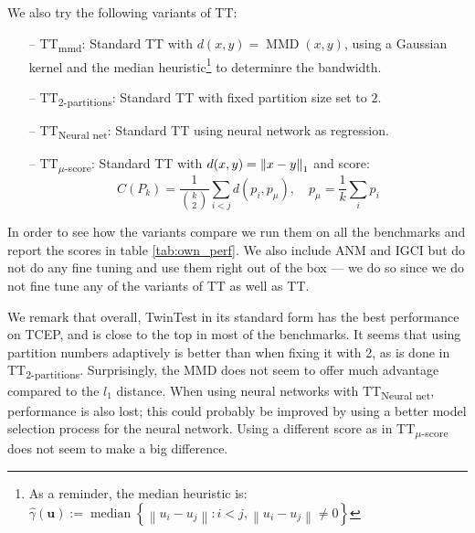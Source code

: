 We also try the following variants of TT:

\begin{itemize}
    \item[--] TT\textsubscript{mmd}: Standard TT with 
        $d(x, y) = \operatorname{MMD}(x, y)$, using a Gaussian kernel and the median heuristic\footnote{
            As a reminder, the median heuristic is: 
            $\hat{\gamma}(\mathbf{u}):=\operatorname{median}\left\{\left\|u_{i}-u_{j}\right\|:  i<j ,\left\|u_{i}-u_{j}\right\| \neq 0\right\}$}
         to determinre the bandwidth.
    \item[--] TT\textsubscript{2-partitions}: Standard TT with fixed partition size set to $2$.
    \item[--] TT\textsubscript{Neural net}: Standard TT using neural network as regression.
    \item[--] TT\textsubscript{$\mu$-score}: Standard TT with $d(x, y) = \left\lVert x - y\right\rVert_1$ and score:
    $$
    C(P_k) = \frac{1}{\binom{k}{2}} \sum_{i < j} d(p_i, p_\mu)
    , \quad p_\mu = \frac{1}{k} \sum_i p_i
    $$
\end{itemize}


In order to see how the variants compare we run them on all the benchmarks and report the 
scores in table \ref{tab:own_perf}. We also include ANM and IGCI but do not do any fine 
tuning and use them right out of the box --- we do so since we do not fine tune any 
of the variants of TT as well as TT. 

We remark that overall, TwinTest in its standard form has the best performance on TCEP, 
and is close to the top in most of the benchmarks. It seems 
that using partition numbers adaptively is better than when fixing it with 2, as is 
done in TT\textsubscript{2-partitions}. Surprisingly, the MMD does not seem to 
offer much advantage compared to the $l_1$ distance.
When using neural networks with TT\textsubscript{Neural net}, performance
is also lost; this could probably be improved by using a better model selection process 
for the neural network. Using a different score as in TT\textsubscript{$\mu$-score} 
does not seem to make a big difference. 

